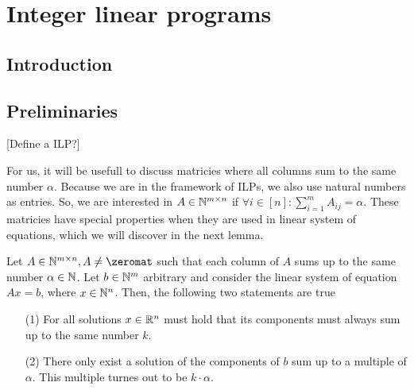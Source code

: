 \chapter{Integer linear programs}
\section{Introduction}

\section{Preliminaries}
[Define a ILP?]

For us, it will be usefull to discuss matricies where all columns sum to the same number $\alpha$. Because we are in the framework of ILPs, we also use natural numbers as entries. So, we are interested in $A \in \mathbb{N}^{m \times n}$ if $\forall i \in [n]\colon \sum_{i=1}^{m}A_{ij} = \alpha$. These matricies have special properties when they are used in linear system of equations, which we will discover in the next lemma.

\begin{lemma}
    \label{lemma:ilp_pre1}
    Let $A\in \N^{m \times n}, A \neq \zeromat$ such that each column of $A$ sums up to the same number $\alpha \in \mathbb{N}$. Let $b \in \mathbb{N}^m$ arbitrary and consider the linear system of equation $Ax=b$, where $x \in \mathbb{N}^n$. Then, the following two statements are true

    \begin{enumerate}
        \item[(1)] For all solutions $x \in \mathbb{R}^n$ must hold that its components must always sum up to the same number $k$.
        \item[(2)] There only exist a solution of the components of $b$ sum up to a multiple of $\alpha$. This multiple turnes out to be $k \cdot \alpha$.
    \end{enumerate}
\end{lemma}

